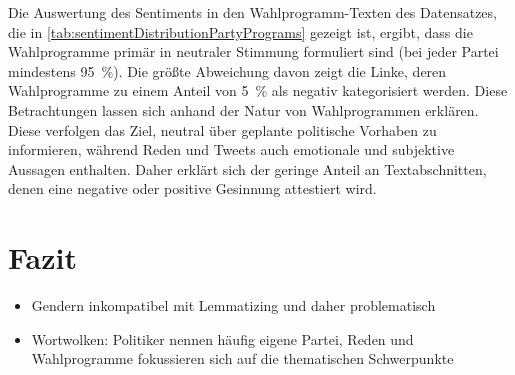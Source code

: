 Die Auswertung des Sentiments in den Wahlprogramm-Texten des Datensatzes, die in \autoref{tab:sentimentDistributionPartyPrograms} gezeigt ist, ergibt, dass die Wahlprogramme primär in neutraler Stimmung formuliert sind (bei jeder Partei mindestens \SI{95}{\percent}). Die größte Abweichung davon zeigt die Linke, deren Wahlprogramme zu einem Anteil von \SI{5}{\percent} als negativ kategorisiert werden. Diese Betrachtungen lassen sich anhand der Natur von Wahlprogrammen erklären. Diese verfolgen das Ziel, neutral über geplante politische Vorhaben zu informieren, während Reden und Tweets auch emotionale und subjektive Aussagen enthalten. Daher erklärt sich der geringe Anteil an Textabschnitten, denen eine negative oder positive Gesinnung attestiert wird.

\section{Fazit} \label{sec:crispConclusion_1}


\begin{itemize}
    \item Gendern inkompatibel mit Lemmatizing und daher problematisch
    \item Wortwolken: Politiker nennen häufig eigene Partei, Reden und Wahlprogramme fokussieren sich auf die thematischen Schwerpunkte
\end{itemize}
